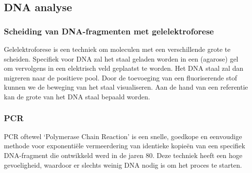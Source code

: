 \documentclass[a4paper,kul]{kulakarticle} %
\begin{document}
\subsection{DNA analyse}
\subsubsection{Scheiding van DNA-fragmenten met gelelektroforese}                                            
Gelelektroforese is een techniek om moleculen met een verschillende grote te scheiden. Specifiek voor DNA zal het staal geladen worden in een (agarose) gel om vervolgens in een elektrisch veld geplaatst te worden. Het DNA staal zal dan migreren naar de positieve pool. Door de toevoeging van een fluoriserende stof kunnen we de beweging van het staal visualiseren. Aan de hand van een referentie kan de grote van het DNA staal bepaald worden. 
\subsubsection{PCR}
PCR oftewel `Polymerase Chain Reaction' is een snelle, goedkope en eenvoudige methode voor exponentiële vermeerdering van identieke kopieën van een specifiek DNA-fragment die ontwikkeld werd in de jaren 80. Deze techniek heeft een hoge gevoeligheid, waardoor er slechts weinig DNA nodig is om het proces te starten. 
\end{document}
